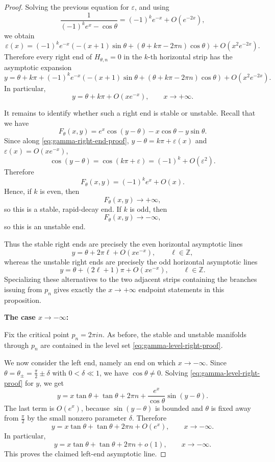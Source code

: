\documentclass[10pt,a4paper]{amsart}
\begin{document}
\begin{proof}
Solving the previous equation for \(\varepsilon\), and using
\[
\frac{1}{(-1)^k e^x-\cos\theta}
=
(-1)^k e^{-x}+O(e^{-2x}),
\]
we obtain
\begin{equation*}\label{eq:gamma-right-epsilon-proof}
\varepsilon(x)
=
(-1)^k e^{-x}
\left(
-(x+1)\sin\theta
+
(\theta+k\pi-2\pi n)\cos\theta
\right)
+
O(x^2e^{-2x}).
\end{equation*}
Therefore every right end of \(H_{\theta,n}=0\) in the \(k\)-th horizontal
strip has the asymptotic expansion
\begin{equation}\label{eq:gamma-right-end-proof}
y
=
\theta+k\pi
+
(-1)^k e^{-x}
\left(
-(x+1)\sin\theta
+
(\theta+k\pi-2\pi n)\cos\theta
\right)
+
O(x^2e^{-2x}).
\end{equation}
In particular,
\[
y=\theta+k\pi+O(xe^{-x}),
\qquad x\to+\infty.
\]

It remains to identify whether such a right end is stable or unstable.  Recall that we have
\[
F_\theta(x,y)
=
e^x\cos(y-\theta)-x\cos\theta-y\sin\theta.
\]
Since along \eqref{eq:gamma-right-end-proof}, \(y-\theta=k\pi+\varepsilon(x)\) and \(\varepsilon(x)=O(xe^{-x})\),
\[
\cos(y-\theta)
=
\cos(k\pi+\varepsilon)
=
(-1)^k+O(\varepsilon^2).
\]
Therefore
\[
F_\theta(x,y)
=
(-1)^k e^x+O(x).
\]
Hence, if \(k\) is even, then
\[
F_\theta(x,y)\to+\infty,
\]
so this is a stable, rapid-decay end.  If \(k\) is odd, then
\[
F_\theta(x,y)\to-\infty,
\]
so this is an unstable end.

Thus the stable right ends are precisely the even horizontal asymptotic lines
\[
y=\theta+2\pi \ell+O(xe^{-x}),
\qquad \ell\in\mathbb Z,
\]
whereas the unstable right ends are precisely the odd horizontal asymptotic
lines
\[
y=\theta+(2\ell+1)\pi+O(xe^{-x}),
\qquad \ell\in\mathbb Z.
\]
Specializing these alternatives to the two adjacent strips containing the
branches issuing from \(p_n\) gives exactly the \(x\to+\infty\) endpoint
statements in this proposition.

\medskip
\noindent\textbf{The case $x\rightarrow-\infty$:}


Fix the critical point \(p_n=2\pi i n\).  As before, the stable and unstable
manifolds through \(p_n\) are contained in the level set \eqref{eq:gamma-level-right-proof}.

We now consider the left end, namely an end on which \(x\to-\infty\).  Since
\(\theta=\theta_\pm=\frac{\pi}{2}\pm\delta\) with \(0<\delta\ll1\), we have
\(\cos\theta\neq0\).  Solving \eqref{eq:gamma-level-right-proof} for \(y\), we get
\begin{equation*}\label{eq:gamma-left-solved-proof}
y
=
x\tan\theta
+
\tan\theta
+
2\pi n
+
\frac{e^x}{\cos\theta}\sin(y-\theta).
\end{equation*}
The last term is \(O(e^x)\), because \(\sin(y-\theta)\) is bounded and
\(\theta\) is fixed away from \(\frac{\pi}{2}\) by the small nonzero parameter
\(\delta\).  Therefore
\begin{equation}\label{eq:gamma-left-asymptotic-proof}
y
=
x\tan\theta
+
\tan\theta
+
2\pi n
+
O(e^x),
\qquad x\to-\infty.
\end{equation}
In particular,
\[
y
=
x\tan\theta
+
\tan\theta
+
2\pi n
+
o(1),
\qquad x\to-\infty.
\]
This proves the claimed left-end asymptotic line.


\end{proof}
\end{document}
